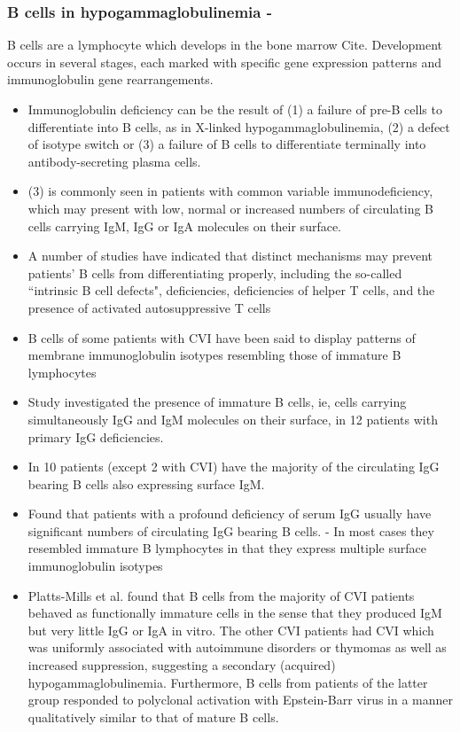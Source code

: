 \documentclass[12pt]{article}
\begin{document}
			\subsubsection{B cells in hypogammaglobulinemia - \citeauthor{Fiorilli86} \citeyear{Fiorilli86}}
			
				B cells are a lymphocyte which develops in the bone marrow {\Huge Cite}. 
				Development occurs in several stages, each marked with specific gene expression patterns and immunoglobulin gene rearrangements.  
				
				\begin{itemize}
					\item Immunoglobulin deficiency can be the result of (1) a failure of pre-B cells to differentiate into B cells, as in X-linked hypogammaglobulinemia, (2) a defect of isotype switch or (3) a failure of B cells to differentiate terminally into antibody-secreting plasma cells.
					\item (3) is commonly seen in patients with common variable immunodeficiency, which may present with low, normal or increased numbers of circulating B cells carrying IgM, IgG or IgA molecules on their surface.
					\item A number of studies have indicated that distinct mechanisms may prevent patients' B cells from differentiating properly, including the so-called ``intrinsic B cell defects", deficiencies, deficiencies of helper T cells, and the presence of activated autosuppressive T cells
					\item B cells of some patients with CVI have been said to display patterns of membrane immunoglobulin isotypes resembling those of immature B lymphocytes
					\item Study investigated the presence of immature B cells, ie, cells carrying simultaneously IgG and IgM molecules on their surface, in 12 patients with primary IgG deficiencies. 
					\item In 10 patients (except 2 with CVI) have the majority of the circulating IgG bearing B cells also expressing surface IgM. 
					\item Found that patients with a profound deficiency of serum IgG usually have significant numbers of circulating IgG bearing B cells. - In most cases they resembled immature B lymphocytes in that they express multiple surface immunoglobulin isotypes
					\item Platts-Mills et al. found that B cells from the majority of CVI patients behaved as functionally immature cells in the sense that they produced IgM but very little IgG or IgA in vitro. The other CVI patients had CVI which was uniformly associated with autoimmune disorders or thymomas as well as increased suppression, suggesting a secondary (acquired) hypogammaglobulinemia. Furthermore, B cells from patients of the latter group responded to polyclonal activation with Epstein-Barr virus in a manner qualitatively similar to that of mature B cells. 
				\end{itemize}
			
\end{document}

